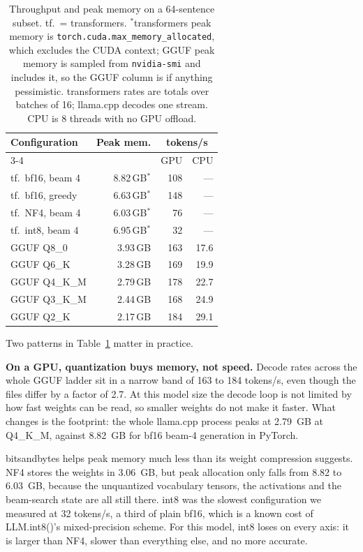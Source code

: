 \documentclass[10pt,twocolumn]{article}
\begin{document}
\begin{table}[t]
\centering\small
\setlength{\tabcolsep}{4pt}
\begin{tabular}{lrrr}
\toprule
Configuration & Peak mem. & \multicolumn{2}{c}{tokens/s} \\
\cmidrule(l){3-4}
              &           & GPU & CPU \\
\midrule
tf.\ bf16, beam 4 & 8.82\,GB$^{\ast}$ & 108 & --- \\
tf.\ bf16, greedy & 6.63\,GB$^{\ast}$ & 148 & --- \\
tf.\ NF4, beam 4  & 6.03\,GB$^{\ast}$ &  76 & --- \\
tf.\ int8, beam 4 & 6.95\,GB$^{\ast}$ &  32 & --- \\
\midrule
GGUF Q8\_0    & 3.93\,GB & 163 & 17.6 \\
GGUF Q6\_K    & 3.28\,GB & 169 & 19.9 \\
GGUF Q4\_K\_M & 2.79\,GB & 178 & 22.7 \\
GGUF Q3\_K\_M & 2.44\,GB & 168 & 24.9 \\
GGUF Q2\_K    & 2.17\,GB & 184 & 29.1 \\
\bottomrule
\end{tabular}
\caption{Throughput and peak memory on a 64-sentence subset. tf.\ =
transformers. $^{\ast}$transformers peak memory is
\texttt{torch.cuda.max\_memory\_allocated}, which excludes the CUDA
context; GGUF peak memory is sampled from \texttt{nvidia-smi} and
includes it, so the GGUF column is if anything pessimistic. transformers
rates are totals over batches of 16; llama.cpp decodes one stream. CPU is
8 threads with no GPU offload.}
\label{tab:speed}
\end{table}

Two patterns in Table~\ref{tab:speed} matter in practice.

\textbf{On a GPU, quantization buys memory, not speed.} Decode rates
across the whole GGUF ladder sit in a narrow band of 163 to 184 tokens/s,
even though the files differ by a factor of 2.7. At this model size the
decode loop is not limited by how fast weights can be read, so smaller
weights do not make it faster. What changes is the footprint: the whole
llama.cpp process peaks at 2.79~GB at Q4\_K\_M, against 8.82~GB for bf16
beam-4 generation in PyTorch.

bitsandbytes helps peak memory much less than its weight compression
suggests. NF4 stores the weights in 3.06~GB, but peak allocation only
falls from 8.82 to 6.03~GB, because the unquantized vocabulary tensors,
the activations and the beam-search state are all still there. int8 was
the slowest configuration we measured at 32 tokens/s, a third of plain
bf16, which is a known cost of LLM.int8()'s mixed-precision scheme. For
this model, int8 loses on every axis: it is larger than NF4, slower than
everything else, and no more accurate.
\end{document}
